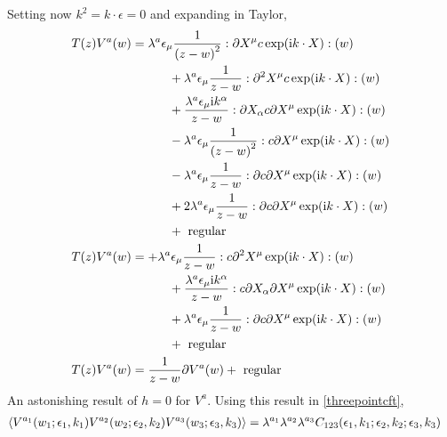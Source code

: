 Setting now $k^2=k\cdot \epsilon=0$ and expanding in Taylor,
\begin{align*}
    T\qty(z) V^a\qty(w)&=\lambda^a\epsilon_\mu\frac{1}{\qty(z-w)^2}:{\partial X^\mu c\exp(\textnormal{i} k\cdot X)}:(w)\\
    &\quad\quad\quad+\lambda^a\epsilon_\mu\frac{1}{z-w}:{\partial^2 X^\mu c\exp(\textnormal{i} k\cdot X)}:(w)\\
    &\quad\quad\quad+\frac{\lambda^a\epsilon_\mu\textnormal{i} k^\alpha}{z-w}:{\partial X_\alpha c\partial X^\mu\exp(\textnormal{i} k\cdot X)}:(w)\\
    &\quad\quad\quad-\lambda^a\epsilon_\mu\frac{1}{\qty(z-w)^2}:c\partial X^\mu\exp(\textnormal{i} k\cdot X):(w)\\
    &\quad\quad\quad-\lambda^a\epsilon_\mu\frac{1}{z-w}:\partial c\partial X^\mu\exp(\textnormal{i} k\cdot X):(w)\\
    &\quad\quad\quad+2\lambda^a\epsilon_\mu\frac{1}{z-w}:\partial c\partial X^\mu\exp(\textnormal{i} k\cdot X):(w)\\
    &\quad\quad\quad+\textnormal{ regular}\\
    T\qty(z) V^a\qty(w)&=+\lambda^a\epsilon_\mu\frac{1}{z-w}:{c\partial^2 X^\mu \exp(\textnormal{i} k\cdot X)}:(w)\\
    &\quad\quad\quad+\frac{\lambda^a\epsilon_\mu\textnormal{i} k^\alpha}{z-w}:{c\partial X_\alpha \partial X^\mu\exp(\textnormal{i} k\cdot X)}:(w)\\
    &\quad\quad\quad+\lambda^a\epsilon_\mu\frac{1}{z-w}:\partial c\partial X^\mu\exp(\textnormal{i} k\cdot X):(w)\\
    &\quad\quad\quad+\textnormal{ regular}\\
    T\qty(z) V^a\qty(w)&=\frac{1}{z-w}\partial V^a\qty(w)+\textnormal{ regular}
\end{align*}
An astonishing result of $h=0$ for $V^a$. Using this result in \cref{threepointcft},
\begin{align*}
    \expval{V^{a_1}\qty(w_1;\epsilon_1,k_1)V^{a_2}\qty(w_2;\epsilon_2,k_2)V^{a_3}\qty(w_3;\epsilon_3,k_3)}&=\lambda^{a_1}\lambda^{a_2}\lambda^{a_3}C_{123}\qty(\epsilon_1,k_1;\epsilon_2,k_2;\epsilon_3,k_3)
\end{align*}

\probitem{}